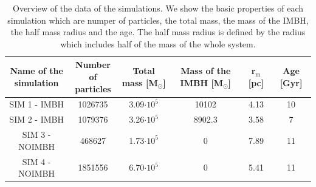 \begin{table}[htbp]
\centering
\begin{tabular}{ c | c | c | c | c | c }
\makecell{Name of the \\simulation} & \makecell{Number of \\ particles} & Total mass [M\(_\odot\)]& \makecell{Mass of the \\ \ac{IMBH} [M\(_\odot\)]}& r\(_\mathrm{m}\) [pc] & Age [Gyr]\\
\hline			
  SIM 1 - IMBH & 1026735 & 3.09\(\cdot 10^5\) & 10102 & 4.13 & 10\\
  SIM 2 - IMBH & 1079376& 3.26\(\cdot 10^5\) & 8902.3 & 3.58 & 7\\
  SIM 3 - NOIMBH & 468627& 1.73\(\cdot 10^5\)& 0 & 7.89 & 11\\
  SIM 4 - NOIMBH & 1851556& 6.70\(\cdot 10^5\)& 0 & 5.41 & 11\\

\end{tabular}
\caption{Overview of the data of the simulations. We show the basic properties of each simulation which are numper of particles, the total mass, the mass of the \ac{IMBH}, the half mass radius and the age. The half mass radius is defined by the radius which includes half of the mass of the whole system.}
\label{tab:overview_simulation}
\end{table}

